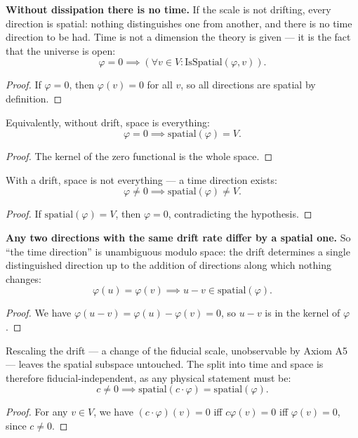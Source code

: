 \begin{theorem}
\textbf{Without dissipation there is no time.} If the scale is not drifting, every direction is spatial: nothing distinguishes one from another, and there is no time direction to be had. Time is not a dimension the theory is given — it is the fact that the universe is open:
\[
\varphi = 0 \implies (\forall v \in V : \text{IsSpatial}(\varphi, v)).
\]
\begin{proof}
If $\varphi = 0$, then $\varphi(v) = 0$ for all $v$, so all directions are spatial by definition.
\end{proof}
\end{theorem}

\begin{theorem}
Equivalently, without drift, space is everything:
\[
\varphi = 0 \implies \text{spatial}(\varphi) = V.
\]
\begin{proof}
The kernel of the zero functional is the whole space.
\end{proof}
\end{theorem}

\begin{theorem}
With a drift, space is not everything — a time direction exists:
\[
\varphi \neq 0 \implies \text{spatial}(\varphi) \neq V.
\]
\begin{proof}
If $\text{spatial}(\varphi) = V$, then $\varphi = 0$, contradicting the hypothesis.
\end{proof}
\end{theorem}

\begin{theorem}
\textbf{Any two directions with the same drift rate differ by a spatial one.} So ``the time direction'' is unambiguous modulo space: the drift determines a single distinguished direction up to the addition of directions along which nothing changes:
\[
\varphi(u) = \varphi(v) \implies u - v \in \text{spatial}(\varphi).
\]
\begin{proof}
We have $\varphi(u - v) = \varphi(u) - \varphi(v) = 0$, so $u - v$ is in the kernel of $\varphi$.
\end{proof}
\end{theorem}

\begin{theorem}
Rescaling the drift — a change of the fiducial scale, unobservable by Axiom A5 — leaves the spatial subspace untouched. The split into time and space is therefore fiducial-independent, as any physical statement must be:
\[
c \neq 0 \implies \text{spatial}(c \cdot \varphi) = \text{spatial}(\varphi).
\]
\begin{proof}
For any $v \in V$, we have $(c \cdot \varphi)(v) = 0$ iff $c \varphi(v) = 0$ iff $\varphi(v) = 0$, since $c \neq 0$.
\end{proof}
\end{theorem}


